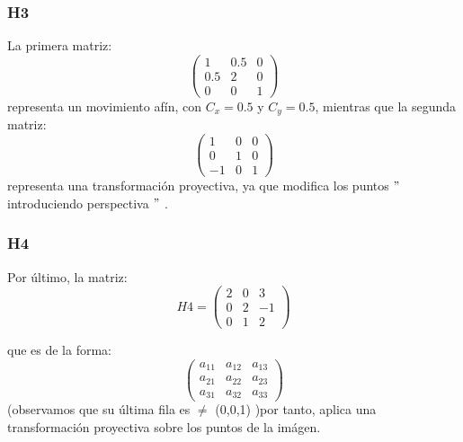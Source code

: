 \subsubsection{H3}
La primera matriz:
\begin{equation}
\begin{pmatrix}
  1 & 0.5 & 0\\ 0.5 & 2 & 0\\ 0 & 0 & 1
\end{pmatrix}
\end{equation} representa un movimiento afín, con $C_{x}=0.5$ y $C_{y}=0.5$, mientras que la segunda matriz:
\begin{equation}
\begin{pmatrix}
  1 & 0 & 0\\ 0 & 1 & 0\\ -1 & 0 & 1
\end{pmatrix}
\end{equation} representa una transformación proyectiva, ya que modifica los puntos $"$ introduciendo perspectiva $"$ .

\subsubsection{H4}
Por último, la matriz:
\begin{equation}
H4  =
\begin{pmatrix}
  2 & 0 & 3\\ 0 & 2 & -1\\ 0 & 1 & 2
\end{pmatrix}
\end{equation}

que es de la forma:
\[\begin{pmatrix} a_{11}&a_{12} &a_{13} \\ a_{21}&a_{22} &a_{23} \\ a_{31}&a_{32} &a_{33} \end{pmatrix}\]
(observamos que su última fila es $\neq$ (0,0,1) )por tanto, aplica una transformación proyectiva sobre los puntos de la imágen.

